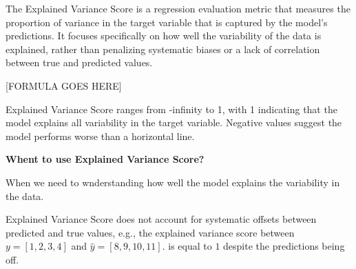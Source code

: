 The Explained Variance Score is a regression evaluation metric that measures the proportion of variance in the target variable that is captured by the model’s predictions.
It focuses specifically on how well the variability of the data is explained, rather than penalizing systematic biases or a lack of correlation between true and predicted values.

\begin{center}
    [FORMULA GOES HERE]
\end{center}

Explained Variance Score ranges from -infinity to 1, with 1 indicating that the model explains all variability in the target variable. Negative values suggest the model performs worse
than a horizontal line.

\textbf{Whent to use Explained Variance Score?}

When we need to wnderstanding how well the model explains the variability in the data.

{
    \item Explained Variance Score does not account for systematic offsets between predicted and true values, e.g., the explained variance score between 
    \( y=[1, 2, 3, 4] \) and \( \hat{y}=[8, 9, 10, 11] \). is equal to $1$ despite the predictions being off.
}
